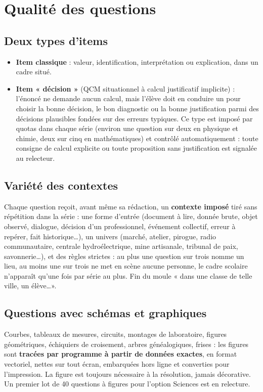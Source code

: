 \documentclass[11pt,a4paper]{article}
\begin{document}
\section{Qualité des questions}

\subsection{Deux types d'items}
\begin{itemize}
  \item \textbf{Item classique} : valeur, identification, interprétation ou explication, dans un cadre situé.
  \item \textbf{Item « décision »} (QCM situationnel à calcul justificatif implicite) : l'énoncé ne demande aucun calcul, mais l'élève doit en conduire un pour choisir la bonne décision, le bon diagnostic ou la bonne justification parmi des décisions plausibles fondées sur des erreurs typiques. Ce type est imposé par quotas dans chaque série (environ une question sur deux en physique et chimie, deux sur cinq en mathématiques) et contrôlé automatiquement : toute consigne de calcul explicite ou toute proposition sans justification est signalée au relecteur.
\end{itemize}

\subsection{Variété des contextes}
Chaque question reçoit, avant même sa rédaction, un \textbf{contexte imposé} tiré sans répétition dans la série : une forme d'entrée (document à lire, donnée brute, objet observé, dialogue, décision d'un professionnel, événement collectif, erreur à repérer, fait historique\ldots), un univers (marché, atelier, pirogue, radio communautaire, centrale hydroélectrique, mine artisanale, tribunal de paix, savonnerie\ldots), et des règles strictes : au plus une question sur trois nomme un lieu, au moins une sur trois ne met en scène aucune personne, le cadre scolaire n'apparaît qu'une fois par série au plus. Fin du moule « dans une classe de telle ville, un élève\ldots ».

\subsection{Questions avec schémas et graphiques}
Courbes, tableaux de mesures, circuits, montages de laboratoire, figures géométriques, échiquiers de croisement, arbres généalogiques, frises : les figures sont \textbf{tracées par programme à partir de données exactes}, en format vectoriel, nettes sur tout écran, embarquées hors ligne et converties pour l'impression. La figure est toujours nécessaire à la résolution, jamais décorative. Un premier lot de 40 questions à figures pour l'option Sciences est en relecture.
\end{document}

